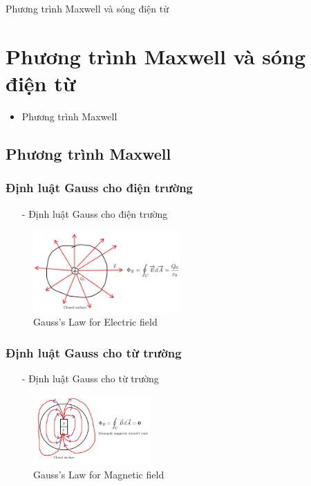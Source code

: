 \documentclass[8pt]{beamer}
\begin{document}
\begin{frame}{Phương trình Maxwell và sóng điện từ}
\section{Phương trình Maxwell và sóng điện từ}
\begin{itemize}
\item Phương trình Maxwell
\end{itemize}
\subsection{Phương trình Maxwell}
\subsubsection{Định luật Gauss cho điện trường}
\begin{itemize}
\item[-]  Định luật Gauss cho điện trường
\end{itemize}
\begin{figure}[h]
			\includegraphics[width=0.5\textwidth]{gauss.jpg}
			\caption{Gauss's Law for Electric field}			\label{fig:re5}
\end{figure}
\subsubsection{Định luật Gauss cho từ trường}
\begin{itemize}
	\item[-] Định luật Gauss cho từ trường
\end{itemize}
\begin{figure}[h]
			\includegraphics[width=0.4\textwidth]{mag.jpg}
			\caption{Gauss's Law for Magnetic field}			\label{fig:re6}
		\end{figure}
\end{frame}
\end{document}

